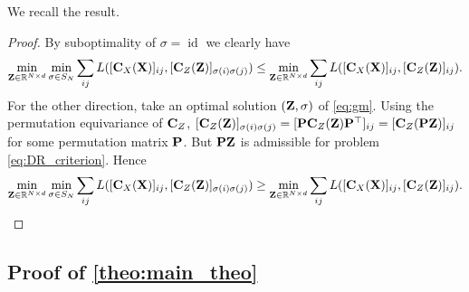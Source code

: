 We recall the result.
\GMproblemequiv*
\begin{proof}
	By suboptimality of $\sigma = \operatorname{id}$ we clearly have 
	\begin{equation}
		\min_{{\mathbf{Z}} \in \mathbb{R}^{N \times d}} \min_{\sigma \in S_N} \sum_{ij} L([{\mathbf{C}}_{X}({\mathbf{X}})]_{ij}, [{\mathbf{C}}_{Z}({\mathbf{Z}})]_{\sigma(i) \sigma(j)}) \leq \min_{{\mathbf{Z}} \in \mathbb{R}^{N \times d}} \sum_{ij} L([{\mathbf{C}}_{X}({\mathbf{X}})]_{ij}, [{\mathbf{C}}_{Z}({\mathbf{Z}})]_{i j}).
	\end{equation}
	For the other direction, take an optimal solution $({\mathbf{Z}}, \sigma)$ of \cref{eq:gm}. Using the permutation equivariance of ${\mathbf{C}}_{Z}$, $[{\mathbf{C}}_{Z}({\mathbf{Z}})]_{\sigma(i) \sigma(j)} = [{\mathbf{P}} {\mathbf{C}}_{Z}({\mathbf{Z}}){\mathbf{P}}^\top]_{ij} = [{\mathbf{C}}_{Z}({\mathbf{P}} {\mathbf{Z}})]_{ij}$ for some permutation matrix ${\mathbf{P}}$. But ${\mathbf{P}} {\mathbf{Z}}$ is admissible for problem \cref{eq:DR_criterion}. Hence 
	\begin{equation}
		\min_{{\mathbf{Z}} \in \mathbb{R}^{N \times d}} \min_{\sigma \in S_N} \sum_{ij} L([{\mathbf{C}}_{X}({\mathbf{X}})]_{ij}, [{\mathbf{C}}_{Z}({\mathbf{Z}})]_{\sigma(i) \sigma(j)}) \geq \min_{{\mathbf{Z}} \in \mathbb{R}^{N \times d}} \sum_{ij} L([{\mathbf{C}}_{X}({\mathbf{X}})]_{ij}, [{\mathbf{C}}_{Z}({\mathbf{Z}})]_{i j}).
	\end{equation}
\end{proof}

\subsection{Proof of \cref{theo:main_theo} \label{proof:theo:main_theo}}

